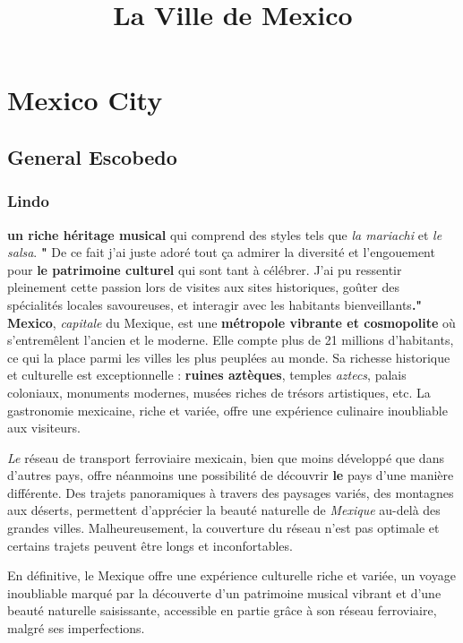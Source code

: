 \documentclass[12pt, a4paper]{article}
\title{La Ville de Mexico}
\author{}
\date{}
\begin{document}
   \maketitle

\section*{Mexico City}

\subsection{General Escobedo}

\subsubsection{Lindo}


\textbf{un riche héritage musical} qui comprend des styles tels que \textit{la mariachi} et \textit{le salsa}. \textbf{"}
De ce fait j'ai juste adoré tout ça admirer la diversité et l’engouement pour \textbf{le patrimoine culturel} qui sont tant à célébrer. J’ai pu ressentir pleinement cette passion lors de visites aux sites historiques, goûter des spécialités locales savoureuses, et interagir avec les habitants bienveillants\textbf{."}
\textbf{Mexico}, \textit{capitale} du Mexique, est une \textbf{métropole vibrante et cosmopolite} où s'entremêlent l'ancien et le moderne. Elle compte plus de 21 millions d'habitants, ce qui la place parmi les villes les plus peuplées au monde. Sa richesse historique et culturelle est exceptionnelle : \textbf{ruines aztèques}, temples \textit{aztecs}, palais coloniaux, monuments modernes, musées riches de trésors artistiques, etc. La gastronomie mexicaine, riche et variée, offre une expérience culinaire inoubliable aux visiteurs.


{}

\textit{Le} réseau de transport ferroviaire mexicain, bien que moins développé que dans d’autres pays, offre néanmoins une possibilité de découvrir \textbf{le} pays d’une manière différente.  Des trajets panoramiques à travers des paysages variés, des montagnes aux déserts, permettent d’apprécier la beauté naturelle de \textit{Mexique} au-delà des grandes villes.  Malheureusement, la couverture du réseau n’est pas optimale et certains trajets peuvent être longs et inconfortables.

En définitive, le Mexique offre une expérience culturelle riche et variée, un voyage inoubliable marqué par la découverte d'un patrimoine musical vibrant et d'une beauté naturelle saisissante, accessible en partie grâce à son réseau ferroviaire, malgré ses imperfections.
\end{document}
